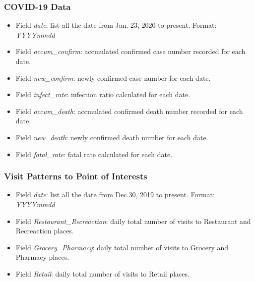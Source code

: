 \documentclass[10pt]{article}
\numberwithin{equation}{section}
\numberwithin{table}{section}
\numberwithin{figure}{section}
\begin{document}
\subsubsection{COVID-19 Data}
\begin{itemize}
	\item Field \textit{date}: list all the date from Jan. 23, 2020 to present. Format: \textit{YYYYmmdd}
	\item Field \textit{accum\_confirm}: accmulated confirmed case number recorded for each date.
	\item Field \textit{new\_confirm}: newly confirmed case number for each date.
	\item Field \textit{infect\_rate}: infection ratio calculated for each date.
	\item Field \textit{accum\_death}: accmulated confirmed death number recorded for each date.
	\item Field \textit{new\_death}: newly confirmed death number for each date.
	\item Field \textit{fatal\_rate}: fatal rate calculated for each date.
\end{itemize}
\subsubsection{Visit Patterns to Point of Interests}
\begin{itemize}
	\item Field \textit{date}: list all the date from Dec.30, 2019 to present. Format: \textit{YYYYmmdd}
	\item Field \textit{Restaurant\_Recreaction}: daily total number of visits to Restaurant and Recreaction places. 
	\item Field \textit{Grocery\_Pharmacy}: daily total number of visits to Grocery and Pharmacy places.
	\item Field \textit{Retail}: daily total number of visits to Retail places. 
\end{itemize}
\end{document}
